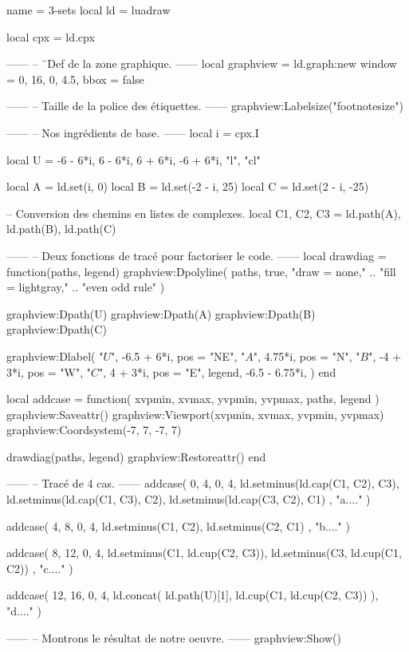 \documentclass[border = 3pt]{standalone}
\begin{document}
\begin{luadraw*}{name = 3-sets}
local ld = luadraw

local cpx = ld.cpx

------
-- ¨Def de la zone graphique.
------
local graphview = ld.graph:new{
  window = {0, 16, 0, 4.5},
  bbox   = false
}

------
-- Taille de la police des étiquettes.
------
graphview:Labelsize("footnotesize")

------
-- Nos ingrédients de base.
------
local i = cpx.I

local U = {
  -6 - 6*i, 6 - 6*i, 6 + 6*i, -6 + 6*i,
  "l",
  "cl"
}

local A = ld.set(i, 0)
local B = ld.set(-2 - i, 25)
local C = ld.set(2 - i, -25)

-- Conversion des chemins en listes de complexes.
local C1, C2, C3 = ld.path(A), ld.path(B), ld.path(C)

------
-- Deux fonctions de tracé pour factoriser le code.
------
local drawdiag = function(paths, legend)
  graphview:Dpolyline(
    paths,
    true,
       "draw = none,"
    .. "fill = lightgray,"
    .. "even odd rule"
  )

  graphview:Dpath(U)
  graphview:Dpath(A)
  graphview:Dpath(B)
  graphview:Dpath(C)

  graphview:Dlabel(
    "$U$", -6.5 + 6*i,
    {pos = "NE"},
    "$A$", 4.75*i,
    {pos = "N"},
    "$B$", -4 + 3*i,
    {pos = "W"},
    "$C$", 4 + 3*i,
    {pos = "E"},
    legend, -6.5 - 6.75*i,
    {}
  )
end

local addcase = function(
    xvpmin, xvmax, yvpmin, yvpmax,
    paths,
    legend
)
  graphview:Saveattr()
    graphview:Viewport(xvpmin, xvmax, yvpmin, yvpmax)
    graphview:Coordsystem(-7, 7, -7, 7)

    drawdiag(paths, legend)
  graphview:Restoreattr()
end

------
-- Tracé de 4 cas.
------
addcase(
  0, 4, 0, 4,
  {
    ld.setminus(ld.cap(C1, C2), C3),
    ld.setminus(ld.cap(C1, C3), C2),
    ld.setminus(ld.cap(C3, C2), C1)
  },
  "a...."
)

addcase(
  4, 8, 0, 4,
  {
    ld.setminus(C1, C2),
    ld.setminus(C2, C1)
  },
  "b...."
)

addcase(
  8, 12, 0, 4,
  {
    ld.setminus(C1, ld.cup(C2, C3)),
    ld.setminus(C3, ld.cup(C1, C2))
  },
  "c...."
)

addcase(
  12, 16, 0, 4,
  ld.concat(
    ld.path(U)[1],
    ld.cup(C1, ld.cup(C2, C3))
  ),
  "d...."
)

------
-- Montrons le résultat de notre oeuvre.
------
graphview:Show()
\end{luadraw*}
\end{document}
